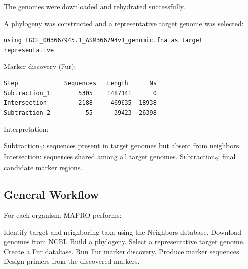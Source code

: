 \documentclass[11pt]{article}
\begin{document}
The genomes were downloaded and rehydrated successfully.

A phylogeny was constructed and a representative target genome was selected:

\begin{verbatim}
using tGCF_003667945.1_ASM366794v1_genomic.fna as target representative
\end{verbatim}

Marker discovery (Fur):

\begin{verbatim}
Step             Sequences   Length      Ns
Subtraction_1        5305    1487141      0
Intersection         2188     469635  18938
Subtraction_2          55      39423  26398
\end{verbatim}

Interpretation:

Subtraction\textsubscript{1}: sequences present in target genomes but absent from neighbors.
Intersection: sequences shared among all target genomes.
Subtraction\textsubscript{2}: final candidate marker regions.
\subsection{General Workflow}
\label{sec:org7202cba}

For each organism, MAPRO performs:

Identify target and neighboring taxa using the Neighbors database.
Download genomes from NCBI.
Build a phylogeny.
Select a representative target genome.
Create a Fur database.
Run Fur marker discovery.
Produce marker sequences.
Design primers from the discovered markers.
\end{document}
